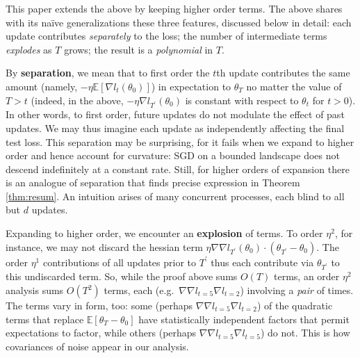 \documentclass[anon,12pt]{colt2021} %
\newcommand{\pr}{\prime}
\newcommand{\expc}{\mathbb{E}}
\begin{document}
            This paper extends the above by keeping higher order terms.  The
            above shares with its na\"ive generalizations these three features,
            discussed below in detail: each update contributes
            \emph{separately} to the loss; the number of intermediate terms
            \emph{explodes} as $T$ grows; the result is a \emph{polynomial} in
            $T$.

            By \textbf{separation}, we mean that to first order the $t$th
            update contributes the same amount (namely, $-\eta \expc[\nabla
            l_{t}(\theta_0)]$) in expectation to $\theta_T$ no matter the value
            of $T>t$ (indeed, in the above, \colorbox{moolime}{$- \eta \nabla
            l_{T^\pr}(\theta_0)$} is constant with respect to $\theta_t$ for
            $t>0$).
            In other words, to first order, future updates do not
            modulate the effect of past updates.
            We may thus imagine each update as independently affecting
            the final test loss.  
            This separation may be surprising, for it fails when we expand to
            higher order and hence account for curvature: SGD on a bounded
            landscape does not descend indefinitely at a constant rate. 
            Still, for higher orders of expansion there is an
            analogue of separation that finds precise expression in Theorem
            \ref{thm:resum}.  An intuition arises of many
            concurrent processes, each blind to all but $d$ updates.

            Expanding to higher order, we encounter an \textbf{explosion} of
            terms.  To order $\eta^2$, for instance, we may not
            discard the hessian term \colorbox{moosky}{$\eta\nabla\nabla
            l_{T^\pr}(\theta_0) \cdot (\theta_{T^\pr} - \theta_0)$}.  The order
            $\eta^1$ contributions of all updates prior to $T^\pr$ thus each
            contribute via $\theta_{T^\pr}$ to this undiscarded term.  So,
            while the proof above sums $O(T)$ terms, an order $\eta^2$ analysis
            sums $O(T^2)$ terms, each (e.g.\ $\nabla\nabla l_{t=5} \nabla
            l_{t=2}$) involving a \emph{pair} of times.  The terms vary in
            form, too: some (perhaps $\nabla\nabla l_{t=5} \nabla l_{t=2}$) of
            the quadratic terms that replace \colorbox{moopink}{$\expc[\theta_T
            - \theta_0]$} have statistically independent factors that permit
            expectations to factor, while others (perhaps $\nabla\nabla l_{t=5}
            \nabla l_{t=5}$) do not.  This is how covariances of noise appear
            in our analysis.
\end{document}

